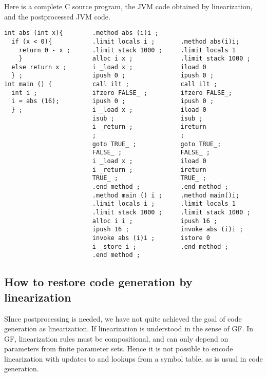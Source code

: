 \documentclass[12pt]{article}
\begin{document}
Here is a complete C source program, the JVM code obtained by linearization, and
the postprocessed JVM code.
\small
\begin{verbatim}
int abs (int x){        .method abs (i)i ;
  if (x < 0){           .limit locals i ;       .method abs(i)i;
    return 0 - x ;      .limit stack 1000 ;     .limit locals 1
    }                   alloc i x ;             .limit stack 1000 ;
  else return x ;       i _load x ;             iload 0
  } ;                   ipush 0 ;               ipush 0 ;
int main () {           call ilt ;              call ilt ;
  int i ;               ifzero FALSE_ ;         ifzero FALSE_;
  i = abs (16);         ipush 0 ;               ipush 0 ;
  } ;                   i _load x ;             iload 0
                        isub ;                  isub ;
                        i _return ;             ireturn
                        ;                       ;
                        goto TRUE_ ;            goto TRUE_;
                        FALSE_ ;                FALSE_ ;
                        i _load x ;             iload 0
                        i _return ;             ireturn
                        TRUE_ ;                 TRUE_ ;
                        .end method ;           .end method ;
                        .method main () i ;     .method main()i;
                        .limit locals i ;       .limit locals 1
                        .limit stack 1000 ;     .limit stack 1000 ;
                        alloc i i ;             ipush 16 ;
                        ipush 16 ;              invoke abs (i)i ;
                        invoke abs (i)i ;       istore 0
                        i _store i ;            .end method ;
                        .end method ;
\end{verbatim}
\normalsize



\subsection{How to restore code generation by linearization}

SInce postprocessing is needed, we have not quite achieved
the goal of code generation as linearization.
If linearization is understood in the
sense of GF. In GF, linearization rules must be
compositional, and can only depend on parameters from
finite parameter sets. Hence it is not possible to encode
linearization with updates to and lookups from a symbol table,
as is usual in code generation. 
\end{document}
